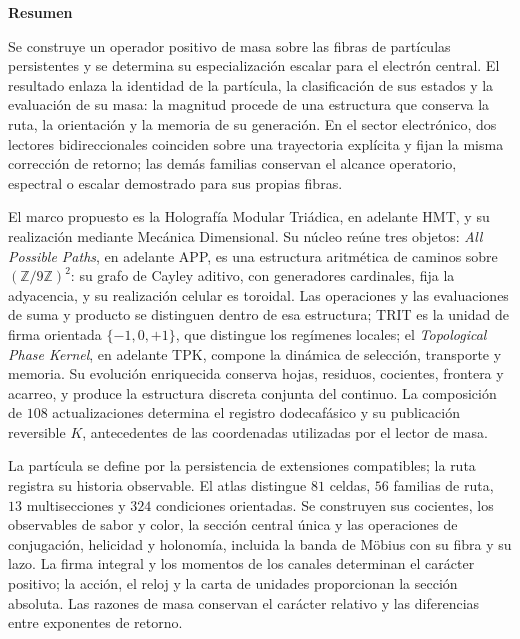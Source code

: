 \begin{center}\bfseries Resumen\end{center}
\begingroup
\fontsize{10.5}{12.8}\selectfont
\setlength{\parskip}{2pt plus 1pt minus .5pt}
\noindent
Se construye un operador positivo de masa sobre las fibras de partículas
persistentes y se determina su especialización escalar para el electrón
central. El resultado enlaza la identidad de la partícula, la clasificación
de sus estados y la evaluación de su masa: la magnitud procede de una
estructura que conserva la ruta, la orientación y la memoria de su
generación. En el sector electrónico, dos lectores bidireccionales
coinciden sobre una trayectoria explícita y fijan la misma corrección de
retorno; las demás familias conservan el alcance operatorio, espectral o
escalar demostrado para sus propias fibras.

El marco propuesto es la Holografía Modular Triádica, en adelante HMT, y
su realización mediante Mecánica Dimensional. Su núcleo reúne tres objetos:
\emph{All Possible Paths}, en adelante APP, es una estructura aritmética
de caminos sobre \((\mathbb Z/9\mathbb Z)^2\): su grafo de Cayley aditivo,
con generadores cardinales, fija la adyacencia, y su realización celular
es toroidal. Las operaciones y las evaluaciones de suma y producto se
distinguen dentro de esa estructura;
TRIT es la unidad de firma orientada \(\{-1,0,+1\}\), que distingue los
regímenes locales; el \emph{Topological Phase Kernel}, en adelante TPK,
compone la dinámica de selección, transporte y memoria. Su evolución
enriquecida conserva hojas, residuos, cocientes, frontera y acarreo, y
produce la estructura discreta conjunta del continuo. La composición de
\(108\) actualizaciones determina el registro dodecafásico y su publicación
reversible \(K\), antecedentes de las coordenadas utilizadas por el lector
de masa.

La partícula se define por la persistencia de extensiones compatibles;
la ruta registra su historia observable. El atlas distingue \(81\) celdas,
\(56\) familias de ruta, \(13\) multisecciones y \(324\) condiciones
orientadas. Se construyen sus cocientes, los observables de sabor y color,
la sección central única y las operaciones de conjugación, helicidad y
holonomía, incluida la banda de Möbius con su fibra y su lazo. La firma
integral y los momentos de los canales determinan el carácter positivo;
la acción, el reloj y la carta de unidades proporcionan la sección
absoluta. Las razones de masa conservan el carácter relativo y las
diferencias entre exponentes de retorno.


